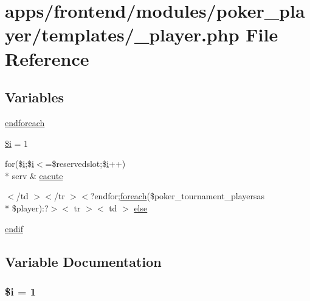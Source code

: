 \hypertarget{__player_8php}{\section{apps/frontend/modules/poker\-\_\-player/templates/\-\_\-player.php File Reference}
\label{__player_8php}
}
\subsection*{Variables}
\begin{DoxyCompactItemize}
\item 
\hyperlink{__player_8php_a672d9707ef91db026c210f98cc601123}{endforeach}
\item 
\hyperlink{__player_8php_a83018d9153d17d91fbcf3bc10158d34f}{\$i} = 1
\item 
for(\$\hyperlink{live_2modules_2partner_2templates_2__rolling_8php_a7e98b8a17c0aad30ba64d47b74e2a6c1}{i};\$\hyperlink{live_2modules_2partner_2templates_2__rolling_8php_a7e98b8a17c0aad30ba64d47b74e2a6c1}{i}$<$=\$reservedslot;\$\hyperlink{live_2modules_2partner_2templates_2__rolling_8php_a7e98b8a17c0aad30ba64d47b74e2a6c1}{i}++) \\*
serv \& \hyperlink{__player_8php_a96211b6404c1046001c7c062399b9ab2}{eacute}
\item 
$<$/td $>$$<$/tr $>$$<$?endfor;\hyperlink{presse_2modules_2news_2templates_2index_success_8php_abc56db52b2e9a59bcd5c9e45ac5cb332}{foreach}(\$poker\-\_\-tournament\-\_\-playersas \\*
\$player)\-:?$>$$<$ tr $>$$<$ td $>$ \hyperlink{__player_8php_a3c57bd1f4e829601d16e37a2a28cb4cc}{else}
\item 
\hyperlink{__player_8php_a82cd33ca97ff99f2fcc5e9c81d65251b}{endif}
\end{DoxyCompactItemize}


\subsection{Variable Documentation}
\hypertarget{__player_8php_a83018d9153d17d91fbcf3bc10158d34f}{
\subsubsection[{\$i}]{\setlength{\rightskip}{0pt plus 5cm}\${\bf i} = 1}}\label{__player_8php_a83018d9153d17d91fbcf3bc10158d34f}


